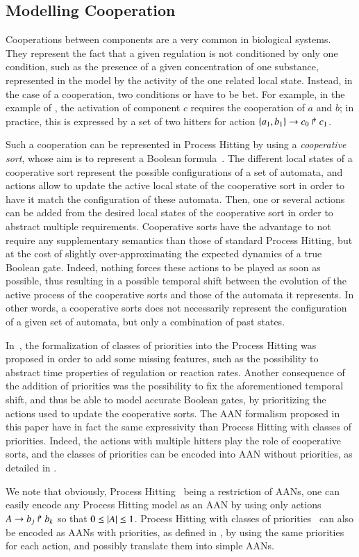 \subsection{Modelling Cooperation}
\label{ssec:cooperation}

Cooperations between components are a very common in biological systems.
They represent the fact that a given regulation is not conditioned by only one condition,
such as the presence of a given concentration of one substance,
represented in the model by the activity of the one related local state.
Instead, in the case of a cooperation, two conditions or have to be bet.
For example, in the example of ,
the activation of component $c$ requires the cooperation of $a$ and $b$;
in practice, this is expressed by a set of two hitters for action
$\{a_1, b_1\}\rightarrow c_0\Rsh c_1$.

Such a cooperation can be represented in Process Hitting by using a \emph{cooperative sort},
whose aim is to represent a Boolean formula~\cite{PMR10-TCSB}.
The different local states of a cooperative sort represent the possible configurations
of a set of automata,
and actions allow to update the active local state of the cooperative sort
in order to have it match the configuration of these automata.
Then, one or several actions can be added from the desired local states of the cooperative sort
in order to abstract multiple requirements.
Cooperative sorts have the advantage to not require any supplementary semantics
than those of standard Process Hitting,
but at the cost of slightly over-approximating the expected dynamics of a true Boolean gate.
Indeed, nothing forces these actions to be played as soon as possible,
thus resulting in a possible temporal shift between the evolution
of the active process of the cooperative sorts and those of the automata it represents.
In other words, a cooperative sorts does not necessarily represent the configuration
of a given set of automata, but only a combination of past states.

In~\cite{FPMR13-CS2Bio}, the formalization of classes of priorities into the Process Hitting
was proposed in order to add some missing features,
such as the possibility to abstract time properties of regulation or reaction rates.
Another consequence of the addition of priorities was the possibility to fix
the aforementioned temporal shift, and thus be able to model accurate Boolean gates,
by prioritizing the actions used to update the cooperative sorts.
The AAN formalism proposed in this paper have in fact the same expressivity than
Process Hitting with classes of priorities.
Indeed, the actions with multiple hitters play the role of cooperative sorts,
and the classes of priorities can be encoded into AAN without priorities,
as detailed in .

We note that obviously, Process Hitting~\cite{PMR10-TCSB} being a restriction of AANs,
one can easily encode any Process Hitting model as an AAN by using only actions
$A\rightarrow b_j\Rsh b_k$ so that $0 \leq |A| \leq 1$.
Process Hitting with classes of priorities~\cite{FPMR13-CS2Bio} can also be encoded as AANs
with priorities, as defined in ,
by using the same priorities for each action,
and possibly translate them into simple AANs.
